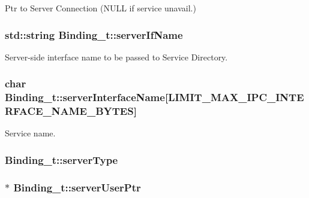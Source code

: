 Ptr to Server Connection (N\+U\+LL if service unavail.) 

\subsubsection[{\texorpdfstring{server\+If\+Name}{serverIfName}}]{\setlength{\rightskip}{0pt plus 5cm}std\+::string Binding\+\_\+t\+::server\+If\+Name}\hypertarget{struct_binding__t_a51bc1d69847c0f2f550a7c478af03c2d}{}\label{struct_binding__t_a51bc1d69847c0f2f550a7c478af03c2d}


Server-\/side interface name to be passed to Service Directory. 

\subsubsection[{\texorpdfstring{server\+Interface\+Name}{serverInterfaceName}}]{\setlength{\rightskip}{0pt plus 5cm}char Binding\+\_\+t\+::server\+Interface\+Name\mbox{[}{\bf L\+I\+M\+I\+T\+\_\+\+M\+A\+X\+\_\+\+I\+P\+C\+\_\+\+I\+N\+T\+E\+R\+F\+A\+C\+E\+\_\+\+N\+A\+M\+E\+\_\+\+B\+Y\+T\+ES}\mbox{]}}\hypertarget{struct_binding__t_a383e8a5e7d911343fe040c0625a8f0ff}{}\label{struct_binding__t_a383e8a5e7d911343fe040c0625a8f0ff}


Service name. 

\subsubsection[{\texorpdfstring{server\+Type}{serverType}}]{ Binding\+\_\+t\+::server\+Type}\hypertarget{struct_binding__t_aadeea2b8fbb7bf79900933d10e171d48}{}\label{struct_binding__t_aadeea2b8fbb7bf79900933d10e171d48}
\subsubsection[{\texorpdfstring{server\+User\+Ptr}{serverUserPtr}}]{$\ast$ Binding\+\_\+t\+::server\+User\+Ptr}\hypertarget{struct_binding__t_ab024fde9ce7c83355b56faaff60d5bcc}{}\label{struct_binding__t_ab024fde9ce7c83355b56faaff60d5bcc}


